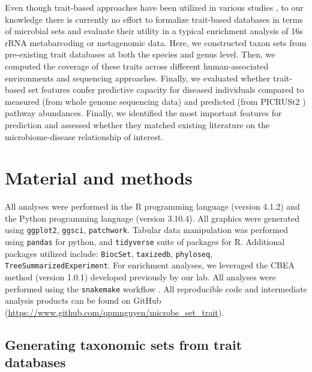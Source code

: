 Even though trait-based approaches have been utilized in various studies \cite{weissman2021exploring, bewick2019traitbased, guittar2019traitbased, krause2014traitbased}, to our knowledge there is currently no effort to formalize trait-based databases in terms of microbial sets and evaluate their utility in a typical enrichment analysis of 16s rRNA metabarcoding or metagenomic data. Here, we constructed taxon sets from pre-existing trait databases at both the species and genus level. Then, we computed the coverage of these traits across different human-associated environments and sequencing approaches. Finally, we evaluated whether trait-based set features confer predictive capacity for diseased individuals compared to measured (from whole genome sequencing data) and predicted (from PICRUSt2 \cite{douglas2020picrust2}) pathway abundances. Finally, we identified the most important features for prediction and assessed whether they matched existing literature on the microbiome-disease relationship of interest.  


\section{Material and methods} \label{ch4_methods}

All analyses were performed in the R programming language (version 4.1.2) \cite{rcoreteam2021language} and the Python programming language (version 3.10.4). All graphics were generated using \texttt{ggplot2}, \texttt{ggsci}, \texttt{patchwork}. Tabular data manipulation was performed using \texttt{pandas} for python, and \texttt{tidyverse} suite of packages for R. Additional packages utilized include: \texttt{BiocSet}, \texttt{taxizedb}, \texttt{phyloseq}, \texttt{TreeSummarizedExperiment}. For enrichment analyses, we leveraged the CBEA \cite{nguyen2021cbea} method (version 1.0.1) developed previously by our lab. All analyses were performed using the \texttt{snakemake} workflow \cite{molder2021sustainable}. All reproducible code and intermediate analysis products can be found on GitHub (\url{https://www.github.com/qpmnguyen/microbe_set_trait}).  

\subsection{Generating taxonomic sets from trait databases}  

